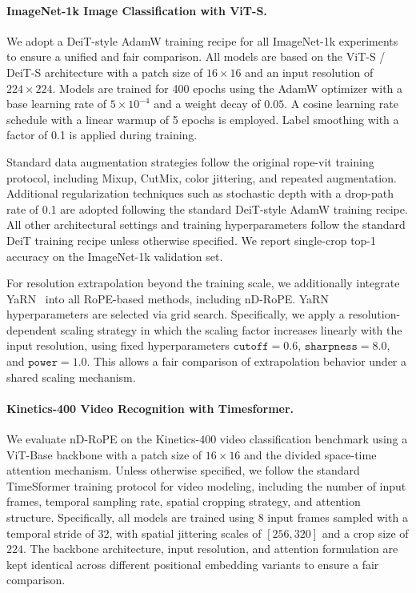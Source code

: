 \documentclass{article}
\theoremstyle{plain}
\theoremstyle{definition}
\theoremstyle{remark}
\begin{document}
\paragraph{ImageNet-1k Image Classification with ViT-S.} We adopt a DeiT-style AdamW training recipe for all ImageNet-1k experiments to ensure a unified and fair comparison. All models are based on the ViT-S / DeiT-S architecture with a patch size of $16 \times 16$ and an input resolution of $224 \times 224$. Models are trained for 400 epochs using the AdamW optimizer with a base learning rate of $5\times10^{-4}$ and a weight decay of $0.05$. A cosine learning rate schedule with a linear warmup of 5 epochs is employed. Label smoothing with a factor of 0.1 is applied during training.

Standard data augmentation strategies follow the original rope-vit\cite{heo2024rotary} training protocol, including Mixup, CutMix, color jittering, and repeated augmentation. Additional regularization techniques such as stochastic depth with a drop-path rate of 0.1 are adopted following the standard DeiT-style AdamW training recipe. All other architectural settings and training hyperparameters follow the standard DeiT training recipe unless otherwise specified. We report single-crop top-1 accuracy on the ImageNet-1k validation set.

For resolution extrapolation beyond the training scale, we additionally integrate YaRN~\cite{peng2023yarn} into all RoPE-based methods, including nD-RoPE. YaRN hyperparameters are selected via grid search. Specifically, we apply a resolution-dependent scaling strategy in which the scaling factor increases linearly with the input resolution, using fixed hyperparameters $\texttt{cutoff}=0.6$, $\texttt{sharpness}=8.0$, and $\texttt{power}=1.0$. This allows a fair comparison of extrapolation behavior under a shared scaling mechanism.

\paragraph{Kinetics-400 Video Recognition with Timesformer.} We evaluate nD-RoPE on the Kinetics-400 video classification benchmark using a ViT-Base backbone with a patch size of $16 \times 16$ and the divided space-time attention mechanism.
Unless otherwise specified, we follow the standard TimeSformer training protocol for video modeling, including the number of input frames, temporal sampling rate, spatial cropping strategy, and attention structure. Specifically, all models are trained using 8 input frames sampled with a temporal stride of 32, with spatial jittering scales of $[256, 320]$ and a crop size of $224$. The backbone architecture, input resolution, and attention formulation are kept identical across different positional embedding variants to ensure a fair comparison.
\end{document}
